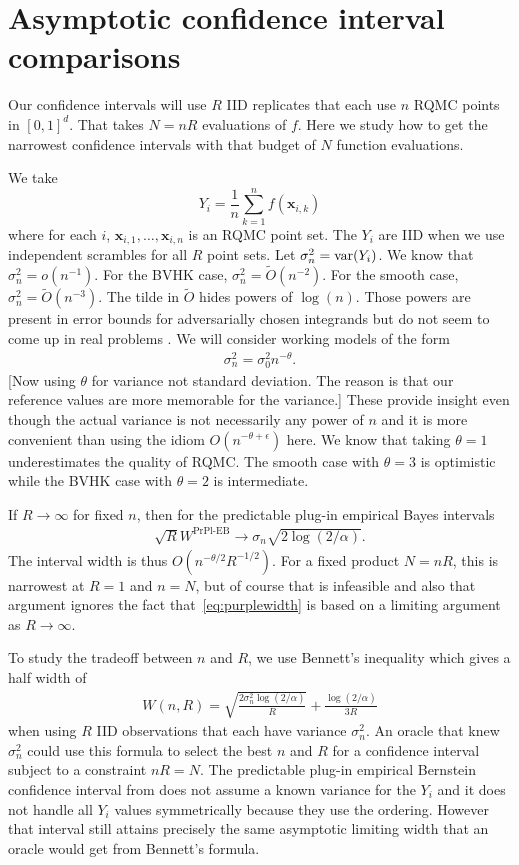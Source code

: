 \documentclass{article}
\newcommand{\art}[1]{\begingroup\color{blue}#1\endgroup}
\newcommand{\bsx}{\boldsymbol{x}}
\newcommand{\prpleb}{\text{PrPl-EB}}
\begin{document}
\section{Asymptotic confidence interval comparisons}\label{sec:asymptotic}

Our confidence intervals will use $R$ IID replicates that each
use $n$ RQMC points in $[0,1]^d$.  That takes $N=nR$
evaluations of $f$. 
Here we study how to get the narrowest confidence
intervals with that budget of $N$ function evaluations.

We take 
$$Y_i=\frac1n\sum_{k=1}^nf(\bsx_{i,k})$$
where for each $i$, $\bsx_{i,1},\dots,\bsx_{i,n}$ is an RQMC
point set. The $Y_i$ are IID when we use independent
scrambles for all $R$ point sets. Let $\sigma^2_n = \operatorname{var}(Y_i)$.
We know that $\sigma^2_n = o(n^{-1}).$
For the BVHK case, $\sigma^2_n=\tilde O(n^{-2})$.  
For the smooth case,
$\sigma^2_n=\tilde O(n^{-3})$.  
The tilde in $\tilde O$ hides powers of $\log(n)$.
Those powers are present in error bounds for adversarially
chosen integrands but do not seem to come up in
real problems \cite{schl:2002,wherearethelogs}.
We will consider working
models of the form
\begin{align}\label{eq:themodel}
\sigma^2_n = \sigma^2_0n^{-\theta}.
\end{align}
\art{[Now using $\theta$ for variance not standard deviation.
The reason is that our reference values are more memorable
for the variance.]}
These provide insight even though the actual variance is not
necessarily any power of $n$ and it is more convenient
than using the idiom $O(n^{-\theta+\epsilon})$ here.
We know that taking $\theta=1$ underestimates
the quality of RQMC. The smooth case with $\theta = 3$ is optimistic
while the BVHK case with $\theta=2$ is intermediate.

If $R\to\infty$ for fixed $n$, then for the predictable
plug-in empirical Bayes intervals
\begin{align}\label{eq:purplewidth}
\sqrt{R}W^\prpleb\to \sigma_n\sqrt{2\log(2/\alpha)}.
\end{align}
The interval width is thus $O(n^{-\theta/2}R^{-1/2})$.
For a fixed product $N=nR$, this is narrowest at $R=1$
and $n=N$, but of course that is infeasible and also
that argument ignores the fact that~\eqref{eq:purplewidth}
is based on a limiting argument as $R\to\infty$.

To study the tradeoff between $n$ and $R$, we use Bennett's 
inequality which gives a half width of
\begin{align}\label{eq:bennettwidth}
W(n,R)=\sqrt{\frac{2\sigma_n^2\log(2/\alpha)}R}
+ \frac{\log(2/\alpha)}{3R}
\end{align}
when using $R$ IID observations that each have variance
$\sigma^2_n$. An oracle that knew $\sigma^2_n$ could
use this formula to select the best $n$ and $R$
for a confidence interval subject to a constraint $nR=N$.
The predictable plug-in empirical Bernstein confidence interval
from \cite{WauRam24a} does not assume a known variance
for the $Y_i$ and it does not handle all $Y_i$ values
symmetrically because they use the ordering.  However
that interval still attains precisely the same asymptotic limiting width
that an oracle would get from Bennett's formula. 
\end{document}
